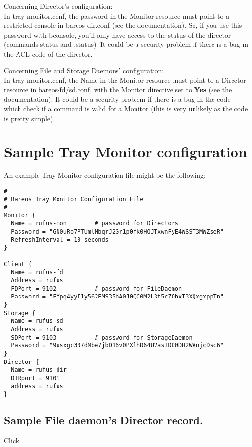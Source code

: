 Concerning Director's configuration: \\
In tray-monitor.conf, the password in the Monitor resource must point to
a restricted console in bareos-dir.conf (see the documentation). So, if
you use this password with bconsole, you'll only have access to the
status of the director (commands status and .status).
It could be a security problem if there is a bug in the ACL code of the
director.

Concerning File and Storage Daemons' configuration:\\
In tray-monitor.conf, the Name in the Monitor resource must point to a
Director resource in bareos-fd/sd.conf, with the Monitor directive set
to {\bf Yes} (see the documentation).
It could be a security problem if there is a bug in the code which check
if a command is valid for a Monitor (this is very unlikely as the code
is pretty simple).


\section{Sample Tray Monitor configuration}
\label{SampleConfiguration1}

An example Tray Monitor configuration file might be the following:

\footnotesize
\begin{verbatim}
#
# Bareos Tray Monitor Configuration File
#
Monitor {
  Name = rufus-mon        # password for Directors
  Password = "GN0uRo7PTUmlMbqrJ2Gr1p0fk0HQJTxwnFyE4WSST3MWZseR"
  RefreshInterval = 10 seconds
}

Client {
  Name = rufus-fd
  Address = rufus
  FDPort = 9102           # password for FileDaemon
  Password = "FYpq4yyI1y562EMS35bA0J0QC0M2L3t5cZObxT3XQxgxppTn"
}
Storage {
  Name = rufus-sd
  Address = rufus
  SDPort = 9103           # password for StorageDaemon
  Password = "9usxgc307dMbe7jbD16v0PXlhD64UVasIDD0DH2WAujcDsc6"
}
Director {
  Name = rufus-dir
  DIRport = 9101
  address = rufus
}
\end{verbatim}
\normalsize

\subsection{Sample File daemon's Director record.}

Click


